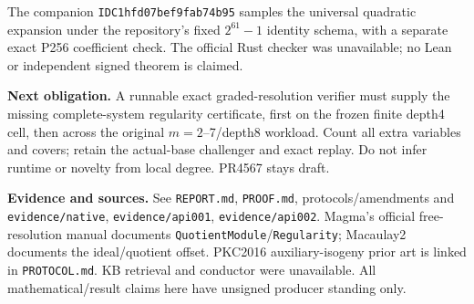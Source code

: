 \documentclass[10pt]{article}
\begin{document}
The companion \texttt{IDC1hfd07bef9fab74b95} samples the universal quadratic
expansion under the repository's fixed $2^{61}-1$ identity schema, with a
separate exact P256 coefficient check. The official Rust checker was
unavailable; no Lean or independent signed theorem is claimed.

\textbf{Next obligation.}
A runnable exact graded-resolution verifier must supply the missing
complete-system regularity certificate, first on the frozen finite depth4
cell, then across the original $m=2$--7/depth8 workload. Count all extra
variables and covers; retain the actual-base challenger and exact replay.
Do not infer runtime or novelty from local degree. PR4567 stays draft.

\textbf{Evidence and sources.}
See \texttt{REPORT.md}, \texttt{PROOF.md}, protocols/amendments and
\texttt{evidence/native}, \texttt{evidence/api001}, \texttt{evidence/api002}.
Magma's official free-resolution manual documents
\texttt{QuotientModule}/\texttt{Regularity}; Macaulay2 documents the
ideal/quotient offset. PKC2016 auxiliary-isogeny prior art is linked in
\texttt{PROTOCOL.md}. KB retrieval and conductor were unavailable. All
mathematical/result claims here have unsigned producer standing only.
\end{document}
